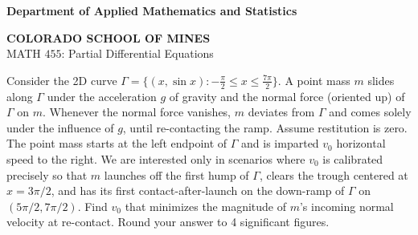 \documentclass[12pt]{article}
\begin{document}
\begin{flushleft}

\textbf{Department of Applied Mathematics and Statistics}

\textbf{COLORADO SCHOOL OF MINES}\\


MATH $455$: Partial Differential Equations
\end{flushleft}

Consider the 2D curve $\Gamma = \{(x, \sin x) : -\frac{\pi}{2} \leq x \leq \frac{7\pi}{2}\}$. A point mass $m$ slides along $\Gamma$ under the acceleration $g$ of gravity and the normal force (oriented up) of $\Gamma$ on $m$. Whenever the normal force vanishes, $m$ deviates from $\Gamma$ and comes solely under the influence of $g$, until re-contacting the ramp. Assume restitution is zero. The point mass starts at the left endpoint of $\Gamma$ and is imparted $v_0$ horizontal speed to the right. We are interested only in scenarios where $v_0$ is calibrated precisely so that $m$ launches off the first hump of $\Gamma$, clears the trough centered at $x=3\pi/2$, and has its first contact-after-launch on the down-ramp of $\Gamma$ on $(5\pi/2, 7\pi/2)$. Find $v_0$ that minimizes the magnitude of $m$'s incoming normal velocity at re-contact. Round your answer to 4 significant figures. \\ \\
\end{document}
